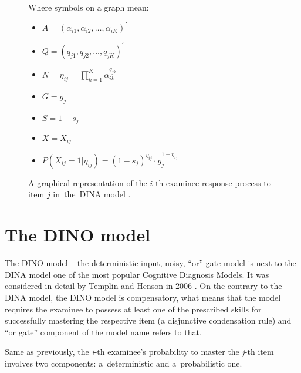 \documentclass[english]{pwr_wmat_praca_dyplomowa}
\theoremstyle{plain}
\numberwithin{theorem}{chapter}
\theoremstyle{definition}
\numberwithin{theorem}{chapter}
\begin{document}
	\begin{figure}[h!]
		\centering
		\begin{multicols}{2}
			
			Where symbols on a graph mean:
			\begin{itemize}
				\item $A = (\alpha_{i1}, \alpha_{i2}, \ldots, \alpha_{iK} )^{'}$
				\item $Q = (q_{j1}, q_{j2}, \ldots, q_{jK} )^{'}$
				\item $N = \eta_{ij} = \prod\limits_{k=1}^{K} \alpha_{ik}^{q_{jk}}$
				\item $G = g_j$
				\item $S = 1-s_j$
				\item $X = X_{ij}$
				\item $P(X_{ij} = 1 | \eta_{ij}) = (1-s_j)^{\eta_{ij}} \cdot g_j^{1-\eta_{ij}}$
			\end{itemize}
		\end{multicols} 
		\caption{A graphical representation of the $i$-th examinee response process to item $j$ in~the~DINA model \cite{de_la_torre_2009}.}\label{graph_dina}
	\end{figure}
	
	\section{The DINO model}
	
	The DINO model -- the deterministic input, noisy, ``or'' gate model is next to the DINA model one of the most popular Cognitive Diagnosis Models. It was considered in detail by Templin and Henson in 2006 \cite{dino_model}. On the contrary to the DINA model, the DINO model is compensatory, what means that the model requires the examinee to possess at least one of the prescribed skills for successfully mastering the respective item (a disjunctive condensation rule) and ``or gate'' component of the model name refers to that. 
	
	Same as previously, the \textit{i}-th examinee's probability to master the \textit{j}-th item involves two components: a~deterministic and a~probabilistic one. 
	
\end{document}
